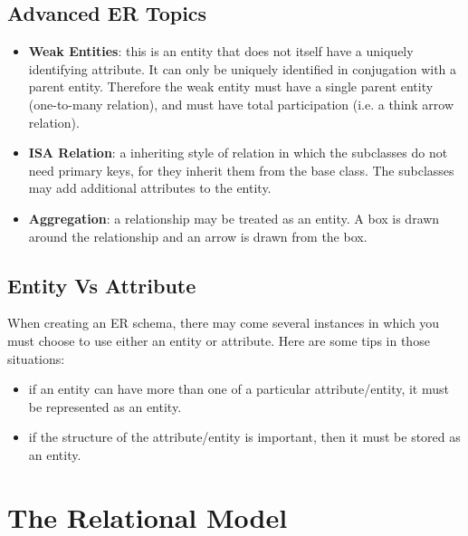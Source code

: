 \documentclass{article}
\begin{document}
\subsection{Advanced ER Topics}

\begin{itemize}
\item \textbf{Weak Entities}: this is an entity that does not itself have a uniquely identifying attribute. It can only be uniquely identified in conjugation with a parent entity. Therefore the weak entity must have a single parent entity (one-to-many relation), and must have total participation (i.e. a think arrow relation).
\item \textbf{ISA Relation}: a inheriting style of relation in which the subclasses do not need primary keys, for they inherit them from the base class. The subclasses may add additional attributes to the entity.
\item \textbf{Aggregation}: a relationship may be treated as an entity. A box is drawn around the relationship and an arrow is drawn from the box.
\end{itemize}

\subsection{Entity Vs Attribute}

When creating an ER schema, there may come several instances in which you must choose to use either an entity or attribute. Here are some tips in those situations:

\begin{itemize}
\item if an entity can have more than one of a particular attribute/entity, it must be represented as an entity.
\item if the structure of the attribute/entity is important, then it must be stored as an entity.
\end{itemize}
\pagebreak
\section{The Relational Model}
\end{document}
